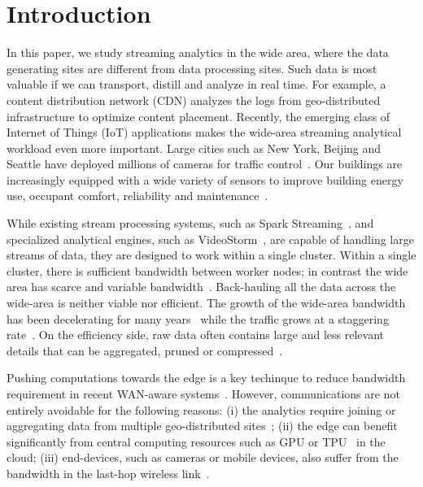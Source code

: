 \section{Introduction}

In this paper, we study streaming analytics in the wide area, where the data
generating sites are different from data processing sites. Such data is most
valuable if we can transport, distill and analyze in real time. For example, a
content distribution network (CDN) analyzes the logs from geo-distributed
infrastructure to optimize content placement. Recently, the emerging class of
Internet of Things (IoT) applications makes the wide-area streaming analytical
workload even more important. Large cities such as New York, Beijing and Seattle
have deployed millions of cameras for traffic
control~\cite{london.surveillance,skynet}. Our buildings are increasingly
equipped with a wide variety of sensors to improve building energy use, occupant
comfort, reliability and maintenance~\cite{krioukov2012building}.

While existing stream processing systems, such as Spark
Streaming~\cite{zaharia2013discretized}, and specialized analytical engines,
such as VideoStorm~\cite{zhang2017live}, are capable of handling large streams
of data, they are designed to work within a single cluster. Within a single
cluster, there is sufficient bandwidth between worker nodes; in contrast the
wide area has scarce and variable bandwidth~\cite{hsieh17gaia,
  vulimiri2015global}. Back-hauling all the data across the wide-area is neither
viable nor efficient. The growth of the wide-area bandwidth has been
decelerating for many years~\cite{global2016telegeography} while the traffic
grows at a staggering rate~\cite{index2013zettabyte}. On the efficiency side,
raw data often contains large and less relevant details that can be aggregated,
pruned or compressed~\cite{rabkin2014aggregation}.

Pushing computations towards the edge is a key techinque to reduce bandwidth
requirement in recent WAN-aware systems~\cite{satyanarayanan2009case,
  rabkin2014aggregation, pu2015low}. However, communications are not entirely
avoidable for the following reasons: (i) the analytics require joining or
aggregating data from multiple geo-distributed
sites~\cite{viswanathan2016clarinet}; (ii) the edge can benefit significantly
from central computing resources such as GPU or TPU~\cite{norm2016google} in the
cloud; (iii) end-devices, such as cameras or mobile devices, also suffer from
the bandwidth in the last-hop wireless link~\cite{zhang2015design,
  abari2017enabling}.

